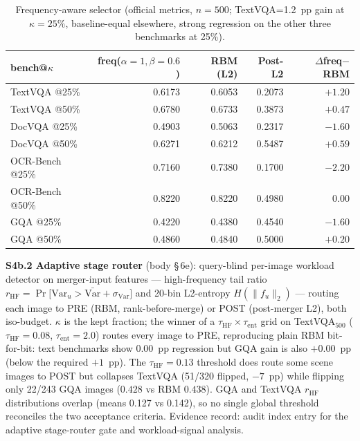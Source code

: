 \documentclass[journal]{IEEEtran}
\begin{document}
\begin{table}[ht]
  \centering
  \scriptsize
  \setlength{\tabcolsep}{1.5pt}
  \begin{tabular}{@{}l r r r r@{}}
    \toprule
    bench@$\kappa$ & freq($\alpha{=}1,\beta{=}0.6$) & RBM (L2) & Post-L2 & $\Delta$freq$-$RBM \\
    \midrule
    TextVQA   @25\% & 0.6173 & 0.6053 & 0.2073 & $+1.20$ \\
    TextVQA   @50\% & 0.6780 & 0.6733 & 0.3873 & $+0.47$ \\
    DocVQA    @25\% & 0.4903 & 0.5063 & 0.2317 & $-1.60$ \\
    DocVQA    @50\% & 0.6271 & 0.6212 & 0.5487 & $+0.59$ \\
    OCR-Bench @25\% & 0.7160 & 0.7380 & 0.1700 & $-2.20$ \\
    OCR-Bench @50\% & 0.8220 & 0.8220 & 0.4980 & $0.00$ \\
    GQA       @25\% & 0.4220 & 0.4380 & 0.4540 & $-1.60$ \\
    GQA       @50\% & 0.4860 & 0.4840 & 0.5000 & $+0.20$ \\
    \bottomrule
  \end{tabular}
  \caption{Frequency-aware selector (official metrics, $n=500$; TextVQA=1.2~pp
  gain at $\kappa{=}25\%$, baseline-equal elsewhere, strong regression on the
  other three benchmarks at 25\%).}
\end{table}

\noindent\textbf{S4b.2 Adaptive stage router} (body \S\,6e): query-blind
per-image workload detector on merger-input features --- high-frequency tail
ratio $r_{\mathrm{HF}} = \Pr\big[\mathrm{Var}_u > \bar{\mathrm{Var}} +
\sigma_{\mathrm{Var}}\big]$ and 20-bin L2-entropy $H(\|f_u\|_2)$ --- routing
each image to PRE (RBM, rank-before-merge) or POST (post-merger L2),
both iso-budget. $\kappa$ is the kept fraction; the winner of a
$\tau_{\mathrm{HF}}{\times}\tau_{\mathrm{ent}}$ grid on TextVQA$_{500}$
($\tau_{\mathrm{HF}}{=}0.08$, $\tau_{\mathrm{ent}}{=}2.0$) routes every image to
PRE, reproducing plain RBM bit-for-bit: text benchmarks show $0.00$~pp
regression but GQA gain is also $+0.00$~pp (below the required $+1$~pp). The
$\tau_{\mathrm{HF}}{=}0.13$ threshold does route some scene images to POST but
collapses TextVQA (51/320 flipped, $-7$~pp) while flipping only 22/243 GQA
images ($0.428$ vs RBM $0.438$). GQA and TextVQA $r_{\mathrm{HF}}$ distributions
overlap (means 0.127 vs 0.142), so no single global threshold reconciles the two
acceptance criteria. Evidence record: audit index entry for the
adaptive stage-router gate and workload-signal analysis.
\end{document}
